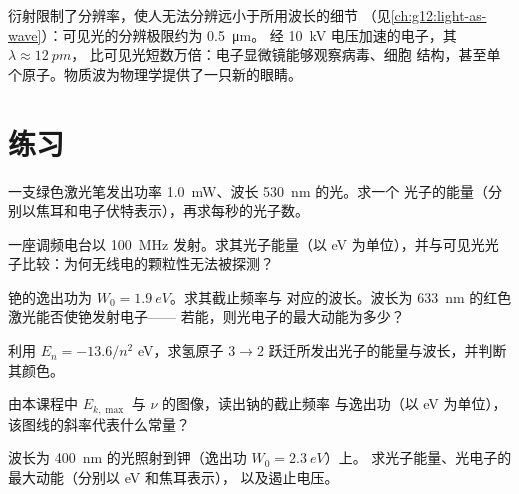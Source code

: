 \begin{example}[电子显微镜]\label{ex:g12:quantum-world:microscope}
衍射限制了分辨率，使人无法分辨远小于所用波长的细节
（见\cref{ch:g12:light-as-wave}）：可见光的分辨极限约为 \qty{0.5}{\micro m}。
经 \qty{10}{kV} 电压加速的电子，其 $\lambda \approx \qty{12}{pm}$，
比可见光短数万倍：电子显微镜能够观察病毒、细胞
结构，甚至单个原子。物质波为物理学提供了一只新的眼睛。
\end{example}

\section{练习}

\begin{exercise}[$\star$]\label{exo:g12:quantum-world:1}
一支绿色激光笔发出功率 \qty{1.0}{mW}、波长 \qty{530}{nm} 的光。求一个
光子的能量（分别以焦耳和电子伏特表示），再求每秒的光子数。
\end{exercise}

\begin{exercise}[$\star$]\label{exo:g12:quantum-world:2}
一座调频电台以 \qty{100}{MHz} 发射。求其光子能量（以
\unit{eV} 为单位），并与可见光光子比较：为何无线电的颗粒性无法被探测？
\end{exercise}

\begin{exercise}[$\star$]\label{exo:g12:quantum-world:3}
铯的逸出功为 $W_0 = \qty{1.9}{eV}$。求其截止频率与
对应的波长。波长为 \qty{633}{nm} 的红色激光能否使铯发射电子——
若能，则光电子的最大动能为多少？
\end{exercise}

\begin{exercise}[$\star$]\label{exo:g12:quantum-world:4}
利用 $E_n = -13.6/n^2$ \unit{eV}，求氢原子
$3 \to 2$ 跃迁所发出光子的能量与波长，并判断其颜色。
\end{exercise}

\begin{exercise}[$\star$]\label{exo:g12:quantum-world:5}
由本课程中 $E_{k,\max}$ 与 $\nu$ 的图像，读出钠的截止频率
与逸出功（以 \unit{eV} 为单位），该图线的斜率代表什么常量？
\end{exercise}

\begin{exercise}[$\star\star$]\label{exo:g12:quantum-world:6}
波长为 \qty{400}{nm} 的光照射到钾（逸出功 $W_0 = \qty{2.3}{eV}$）上。
求光子能量、光电子的最大动能（分别以 \unit{eV} 和焦耳表示），
以及遏止电压。
\end{exercise}

